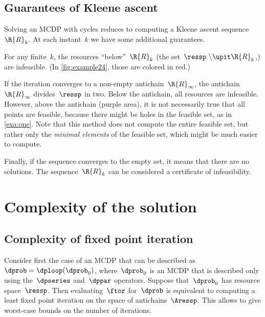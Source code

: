 \subsection{Guarantees of Kleene ascent}

\noindent Solving an MCDP with cycles reduces to computing a Kleene
ascent sequence~$\R{R}_{k}.$ At each instant~$k$ we have some
additional guarantees.

For any finite~$k$, the resources ``below''~$\R{R}_{k}$ (the
set~$\ressp\ \backslash\upit\R{R}_{k}$,) are infeasible. (In \cref{fig:example24},
those are colored in red.)

If the iteration converges to a non-empty antichain~$\R{R}_{\infty}$,
the antichain~$\R{R}_{\infty}$ divides~$\ressp$ in two. Below
the antichain, all resources are infeasible. However, above the antichain
(purple area), it is not necessarily true that all points are feasible,
because there might be holes in the feasible set, as in \cref{exa:one}.
Note that this method does not compute the entire feasible set, but
rather only the \emph{minimal elements} of the feasible set, which
might be much easier to compute.

Finally, if the sequence converges to the empty set, it means that
there are no solutions. The sequence~$\R{R}_{k}$ can be considered
a certificate of infeasibility.

\section{Complexity of the solution}

\subsection{Complexity of fixed point iteration}

Consider first the case of an MCDP that can be described as~$\dprob=\dploop(\dprob_{0})$,
where~$\dprob_{0}$ is an MCDP that is described only using the~$\dpseries$
and~$\dppar$ operators. Suppose that~$\dprob_{0}$ has resource
space~$\ressp$. Then evaluating~$\ftor$ for~$\dprob$ is equivalent
to computing a least fixed point iteration on the space of antichains~$\Aressp$.
This allows to give worst-case bounds on the number of iterations.

